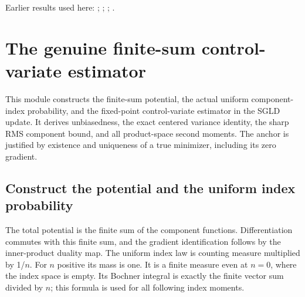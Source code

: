 \documentclass[11pt,a4paper]{report}
\begin{document}
Earlier results used here: \cite[Section~3.17.3]{LangevinLean2026ULASC}; \cite[Section~3.17.4]{LangevinLean2026ULASC}; \cite[Section~3.26.3]{LangevinLean2026ULASC}; \cite[Section~3.36.7]{LangevinLean2026ULASC}.
\section{\texorpdfstring{The genuine finite-sum control-variate estimator}{The genuine finite-sum control-variate estimator}}
\label{proof-module-AverageLMC-SGLDEstimator-lean}


This module constructs the finite-sum potential, the actual uniform component-index probability, and the fixed-point control-variate estimator in the SGLD update. It derives unbiasedness, the exact centered variance identity, the sharp RMS component bound, and all product-space second moments. The anchor is justified by existence and uniqueness of a true minimizer, including its zero gradient.

\subsection{\texorpdfstring{Construct the potential and the uniform index probability}{Construct the potential and the uniform index probability}}
\label{report-step-AverageLMC-SGLDEstimator-lean-1}


The total potential is the finite sum of the component functions. Differentiation commutes with this finite sum, and the gradient identification follows by the inner-product duality map. The uniform index law is counting measure multiplied by 1/\allowbreak{}\(n\). For \(n\) positive its mass is one. It is a finite measure even at \(n=0\), where the index space is empty. Its Bochner integral is exactly the finite vector sum divided by \(n\); this formula is used for all following index moments.
\end{document}
